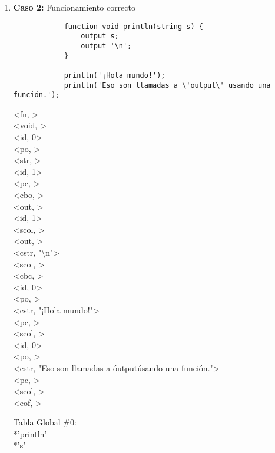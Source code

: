 \documentclass{article}
\begin{document}
\begin{enumerate}
    \newpage
    
    \item \textbf{Caso 2:} Funcionamiento correcto
    
    \begin{tcolorbox}[title={Código fuente}, colback=white]
        \begin{lstlisting}
            function void println(string s) {
                output s;
                output '\n';
            }
            
            println('¡Hola mundo!');
            println('Eso son llamadas a \'output\' usando una función.');
        \end{lstlisting}
    \end{tcolorbox}

    \begin{tcolorbox}[title={Volcado del fichero de tokens}, colback=white]
        <fn, >\\
        <void, >\\
        <id, 0>\\
        <po, >\\
        <str, >\\
        <id, 1>\\
        <pc, >\\
        <cbo, >\\
        <out, >\\
        <id, 1>\\
        <scol, >\\
        <out, >\\
        <cstr, "\textbackslash n">\\
        <scol, >\\
        <cbc, >\\
        <id, 0>\\
        <po, >\\
        <cstr, "¡Hola mundo!">\\
        <pc, >\\
        <scol, >\\
        <id, 0>\\
        <po, >\\
        <cstr, "Eso son llamadas a \'output\' usando una función.">\\
        <pc, >\\
        <scol, >\\
        <eof, >
    \end{tcolorbox}

    \begin{tcolorbox}[title={Volcado del fichero de la tabla de símbolos}, colback=white]
        Tabla Global \#0:\\
        *'println'\\
        *'s'
    \end{tcolorbox}


\end{enumerate}
\end{document}
